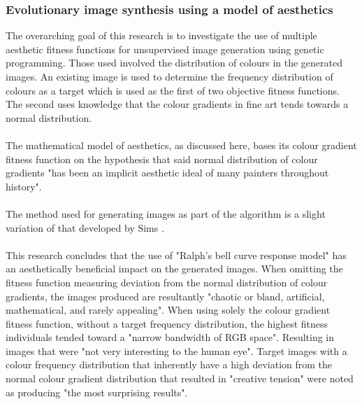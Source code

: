 \documentclass[10pt,a4paper]{article}
\begin{document}
\subsubsection{Evolutionary image synthesis using a model of aesthetics \cite{aesthetic measures}}

The overarching goal of this research is to investigate the use of multiple aesthetic fitness functions for unsupervised image generation using genetic programming.
Those used involved the distribution of colours in the generated images.
An existing image is used to determine the frequency distribution of colours as a target which is used as the first of two objective fitness functions.
The second uses knowledge that the colour gradients in fine art tends towards a normal distribution.
\\\\
The mathematical model of aesthetics, as discussed here, bases its colour gradient fitness function on the hypothesis that said normal distribution of colour gradients "has been an implicit aesthetic ideal of many painters throughout history".
\\\\
The method used for generating images as part of the algorithm is a slight variation of that developed by Sims \cite{sims}.
\\\\
This research concludes that the use of "Ralph's bell curve response model" has an aesthetically beneficial impact on the generated images.
When omitting the fitness function measuring deviation from the normal distribution of colour gradients, the images produced are resultantly "chaotic or bland, artificial, mathematical, and rarely appealing".
When using solely the colour gradient fitness function, without a target frequency distribution, the highest fitness individuals tended toward a "narrow bandwidth of RGB space".
Resulting in images that were "not very interesting to the human eye".
Target images with a colour frequency distribution that inherently have a high deviation from the normal colour gradient distribution that resulted in "creative tension" were noted as producing "the most surprising results".
\end{document}
